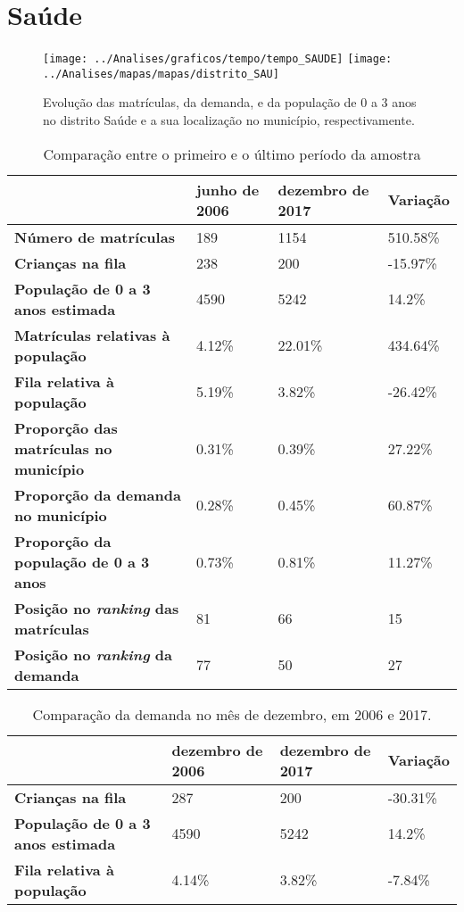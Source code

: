 \section{Saúde}
\begin{figure}[H]
	\centering
	\texttt{[image: ../Analises/graficos/tempo/tempo\_SAUDE]}
	\texttt{[image: ../Analises/mapas/mapas/distrito\_SAU]}
	\caption{Evolução das matrículas, da demanda, e da população de 0 a 3 anos no distrito Saúde e a sua localização no município, respectivamente.}
\end{figure}
\begin{table}[H]
	\begin{tabular}{|l|l|l|l|}
		\hline
		\textbf{}                                      & \textbf{junho de 2006}       & \textbf{dezembro de 2017}    & \textbf{Variação} \\ \hline
		\textbf{Número de matrículas}                  & 189 & 1154 & 510.58\% \\ \hline
		\textbf{Crianças na fila}                      & 238 & 200 & -15.97\% \\ \hline
		\textbf{População de 0 a 3 anos estimada}      & 4590 & 5242 & 14.2\% \\ \hline
		\textbf{Matrículas relativas à população}      & 4.12\% & 22.01\% & 434.64\% \\ \hline
		\textbf{Fila relativa à população}             & 5.19\% & 3.82\% & -26.42\% \\ \hline
		\textbf{Proporção das matrículas no município} & 0.31\% & 0.39\% & 27.22\% \\ \hline
		\textbf{Proporção da demanda no município}     & 0.28\% & 0.45\% & 60.87\% \\ \hline
		\textbf{Proporção da população de 0 a 3 anos}  & 0.73\% & 0.81\% & 11.27\% \\ \hline
		\textbf{Posição no \textit{ranking} das matrículas}     & 81 & 66 & 15 \\ \hline
		\textbf{Posição no \textit{ranking} da demanda}         & 77 & 50 & 27 \\ \hline
	\end{tabular}
	\caption{Comparação entre o primeiro e o último período da amostra}
\end{table}
\begin{table}[H]
	\begin{tabular}{|l|l|l|l|}
		\hline
		\textbf{}                                 & \textbf{dezembro de 2006} & \textbf{dezembro de 2017} & \textbf{Variação} \\ \hline
		\textbf{Crianças na fila}                      & 287 & 200 & -30.31\% \\ \hline
		\textbf{População de 0 a 3 anos estimada}      & 4590 & 5242 & 14.2\% \\ \hline
		\textbf{Fila relativa à população}             & 4.14\% & 3.82\% & -7.84\% \\ \hline
	\end{tabular}
	\caption{Comparação da demanda no mês de dezembro, em 2006 e 2017.}
\end{table}
